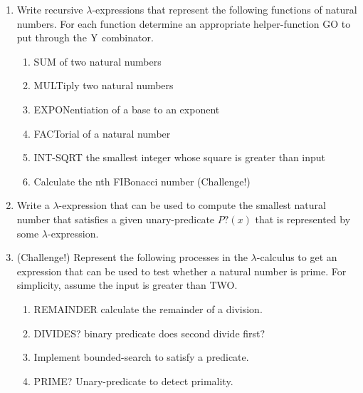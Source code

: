 \documentclass[11pt]{report}
\begin{document}
\begin{enumerate}
	
	\item Write recursive $\lambda$-expressions that represent the following functions of natural numbers. For each function determine an appropriate helper-function GO to put through the $\text{Y}$ combinator. 
	
		\begin{enumerate}
			\item SUM of two natural numbers
			\item MULTiply two natural numbers
			\item EXPONentiation of a base to an exponent
			\item FACTorial of a natural number
			\item INT-SQRT the smallest integer whose square is greater than input
			\item Calculate the nth FIBonacci number (Challenge!)
		\end{enumerate}

	\item Write a $\lambda$-expression that can be used to compute the smallest natural number that satisfies a given unary-predicate $P?(x)$ that is represented by some $\lambda$-expression. 		

	\item (Challenge!) Represent the following processes in the $\lambda$-calculus to get an expression that can be used to test whether a natural number is prime. For simplicity, assume the input is greater than TWO.
	
		\begin{enumerate}
			\item REMAINDER calculate the remainder of a division.
			\item DIVIDES? binary predicate does second divide first?
			\item Implement bounded-search to satisfy a predicate.
			\item PRIME? Unary-predicate to detect primality.
		\end{enumerate}
	

	
	


\end{enumerate}
\end{document}
